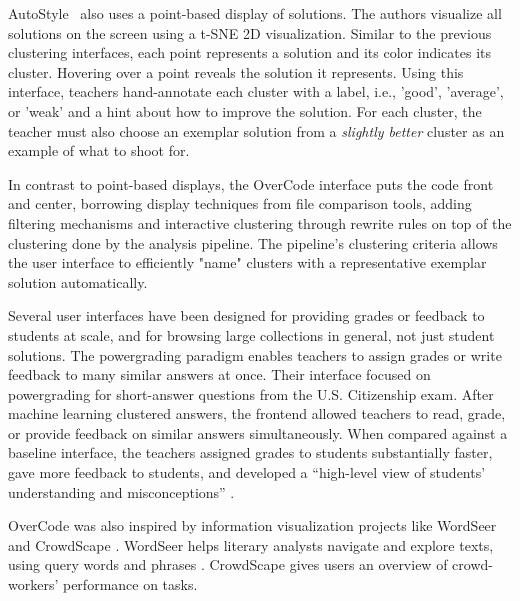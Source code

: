 AutoStyle~\cite{choudhury2016autostyle} also uses a point-based display of solutions. The authors visualize all solutions on the screen using a t-SNE 2D visualization. Similar to the previous clustering interfaces, each point represents a solution and its color indicates its cluster. Hovering over a point reveals the solution it represents. Using this interface, teachers hand-annotate each cluster with a label, i.e., 'good', 'average', or 'weak' and a hint about how to improve the solution. For each cluster, the teacher must also choose an exemplar solution from a {\it slightly better} cluster as an example of what to shoot for.

In contrast to point-based displays, the OverCode interface puts the code front and center, borrowing display techniques from file comparison tools, adding filtering mechanisms and interactive clustering through rewrite rules on top of the clustering done by the analysis pipeline. The pipeline's clustering criteria allows the user interface to efficiently "name" clusters with a representative exemplar solution automatically.

Several user interfaces have been designed for providing grades or feedback to students at scale, and for browsing large collections in general, not just student solutions. The powergrading paradigm \cite{basupowergrading} enables teachers to assign grades or write feedback to many similar answers at once. Their interface focused on powergrading for short-answer questions from the U.S. Citizenship exam. After machine learning clustered answers, the frontend allowed teachers to read, grade, or provide feedback on similar answers simultaneously. When compared against a baseline interface, the teachers assigned grades to students substantially faster, gave more feedback to students, and developed a ``high-level view of students' understanding and misconceptions'' \cite{basuDivideAndConquer}.

OverCode was also inspired by information visualization projects like WordSeer \cite{wordseerlitcomp13,wordseercikm13} and CrowdScape \cite{crowdscape}. WordSeer helps literary analysts navigate and explore texts, using query words and phrases \cite{wordseerhcir11}. CrowdScape gives users an overview of crowd-workers’ performance on tasks.


